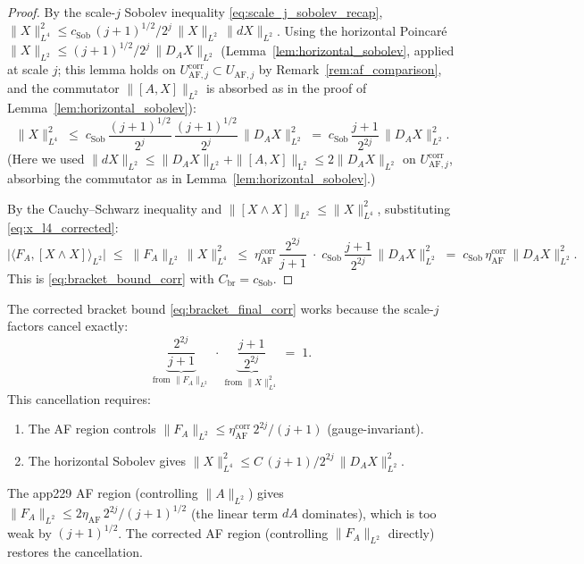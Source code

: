 \begin{proof}
By the scale-$j$ Sobolev inequality
\eqref{eq:scale_j_sobolev_recap},
$\|X\|_{L^{4}}^{2}\le c_{\mathrm{Sob}}\,(j+1)^{1/2}/2^{j}\,
\|X\|_{L^{2}}\,\|dX\|_{L^{2}}$. Using the horizontal Poincar\'e
$\|X\|_{L^{2}}\le(j+1)^{1/2}/2^{j}\,\|D_{A}X\|_{L^{2}}$
(Lemma~\ref{lem:horizontal_sobolev}, applied at scale $j$; this
lemma holds on $U_{\mathrm{AF},j}^{\mathrm{corr}}\subset
U_{\mathrm{AF},j}$ by Remark~\ref{rem:af_comparison}, and the
commutator $\|[A,X]\|_{L^{2}}$ is absorbed as in the proof of
Lemma~\ref{lem:horizontal_sobolev}):
\begin{equation}
\label{eq:x_l4_corrected}
  \|X\|_{L^{4}}^{2}
  \;\le\;c_{\mathrm{Sob}}\,\frac{(j+1)^{1/2}}{2^{j}}\,
  \frac{(j+1)^{1/2}}{2^{j}}\,\|D_{A}X\|_{L^{2}}^{2}
  \;=\;c_{\mathrm{Sob}}\,\frac{j+1}{2^{2j}}\,
  \|D_{A}X\|_{L^{2}}^{2}.
\end{equation}
(Here we used $\|dX\|_{L^{2}}\le\|D_{A}X\|_{L^{2}}+\|[A,X]\|_{
\mathrm{L^{2}}}\le 2\|D_{A}X\|_{L^{2}}$ on $U_{\mathrm{AF},j}^{
\mathrm{corr}}$, absorbing the commutator as in
Lemma~\ref{lem:horizontal_sobolev}.)

By the Cauchy--Schwarz inequality and
$\|[X\wedge X]\|_{L^{2}}\le\|X\|_{L^{4}}^{2}$, substituting
\eqref{eq:x_l4_corrected}:
\begin{equation}
\label{eq:bracket_final_corr}
  \bigl|\langle F_{A},[X\wedge X]\rangle_{L^{2}}\bigr|
  \;\le\;\|F_{A}\|_{L^{2}}\,\|X\|_{L^{4}}^{2}
  \;\le\;\eta_{\mathrm{AF}}^{\mathrm{corr}}\,\frac{2^{2j}}{j+1}
  \;\cdot\;c_{\mathrm{Sob}}\,\frac{j+1}{2^{2j}}\,
  \|D_{A}X\|_{L^{2}}^{2}
  \;=\;c_{\mathrm{Sob}}\,\eta_{\mathrm{AF}}^{\mathrm{corr}}\,
  \|D_{A}X\|_{L^{2}}^{2}.
\end{equation}
This is \eqref{eq:bracket_bound_corr} with
$C_{\mathrm{br}}=c_{\mathrm{Sob}}$.
\end{proof}

\begin{remark}
\label{rem:key_cancellation}
The corrected bracket bound \eqref{eq:bracket_final_corr} works
because the scale-$j$ factors cancel exactly:
\begin{equation*}
  \underbrace{\frac{2^{2j}}{j+1}}_{\text{from }\|F_{A}\|_{L^{2}}}
  \;\cdot\;
  \underbrace{\frac{j+1}{2^{2j}}}_{\text{from }\|X\|_{L^{4}}^{2}}
  \;=\;1.
\end{equation*}
This cancellation requires:
\begin{enumerate}
\item The AF region controls $\|F_{A}\|_{L^{2}}\le
\eta_{\mathrm{AF}}^{\mathrm{corr}}\,2^{2j}/(j+1)$ (gauge-invariant).
\item The horizontal Sobolev gives
$\|X\|_{L^{4}}^{2}\le C\,(j+1)/2^{2j}\,\|D_{A}X\|_{L^{2}}^{2}$.
\end{enumerate}
The app229 AF region (controlling $\|A\|_{L^{2}}$) gives
$\|F_{A}\|_{L^{2}}\le 2\eta_{\mathrm{AF}}\,2^{2j}/(j+1)^{1/2}$
(the linear term $dA$ dominates), which is too weak by
$(j+1)^{1/2}$. The corrected AF region (controlling
$\|F_{A}\|_{L^{2}}$ directly) restores the cancellation.
\end{remark}

